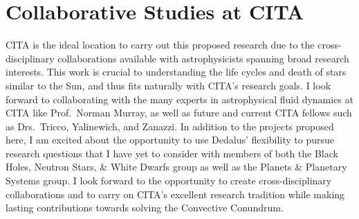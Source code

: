 \documentclass[preprint, hmargin=1in, vmargin=1in]{aastex62}
\begin{document}
\section*{\textbf{Collaborative Studies at CITA}}
CITA is the ideal location to carry out this proposed research due to the cross-disciplinary collaborations available with astrophysicists spanning broad research interests.
This work is crucial to understanding the life cycles and death of stars similar to the Sun, and thus fits naturally with CITA's research goals.
I look forward to collaborating with the many experts in astrophysical fluid dynamics at CITA like Prof.~Norman Murray, as well as future and current CITA fellows such as Drs.~Tricco, Yalinewich, and Zanazzi.
In addition to the projects proposed here, I am excited about the opportunity to use Dedalus' flexibility to pursue research questions that I have yet to consider with members of both the Black Holes, Neutron Stars, \& White Dwarfs group as well as the Planets \& Planetary Systems group.
I look forward to the opportunity to create cross-disciplinary collaborations and to carry on CITA's excellent research tradition while making lasting contributions towards solving the Convective Conundrum.



\end{document}
